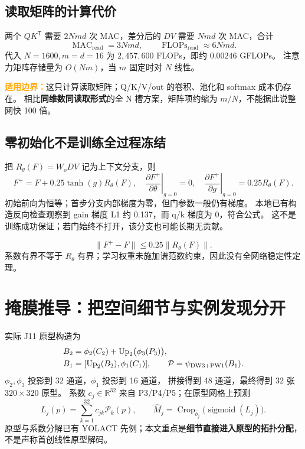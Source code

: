 \documentclass[UTF8,a4paper,11pt,fontset=windows]{ctexart}
\newcommand{\R}{\mathbb{R}}
\newcommand{\sigmoid}{\operatorname{sigmoid}}
\newcommand{\Up}{\operatorname{Up}}
\newcommand{\tr}{\mathsf{T}}
\newcommand{\limitation}[1]{\par\noindent\textcolor{orange}{\textbf{适用边界：}}#1\par}
\begin{document}
\subsection{读取矩阵的计算代价}
两个 \(QK^\tr\) 需要 \(2Nmd\) 次 MAC，差分后的 \(DV\) 需要 \(Nmd\) 次 MAC，合计
\begin{equation}
\operatorname{MAC}_{\mathrm{read}}=3Nmd,
\qquad \operatorname{FLOPs}_{\mathrm{read}}\approx6Nmd.
\label{eq:attncost}
\end{equation}
代入 \(N=1600,m=d=16\) 为 \(2{,}457{,}600\) FLOPs，即约 \(0.00246\) GFLOPs。
注意力矩阵存储量为 \(O(Nm)\)，当 \(m\) 固定时对 \(N\) 线性。
\limitation{这只计算读取矩阵；Q/K/V/out 的卷积、池化和 softmax 成本仍存在。
相比\textbf{同维数同读取形式}的全 N 槽方案，矩阵项约缩为 \(m/N\)，不能据此说整网快 100 倍。}

\subsection{零初始化不是训练全过程冻结}
把 \(R_\theta(F)=W_oDV\) 记为上下文分支，则
\begin{equation}
F^+=F+0.25\tanh(g)R_\theta(F),\quad
\left.\frac{\partial F^+}{\partial\theta}\right|_{g=0}=0,\quad
\left.\frac{\partial F^+}{\partial g}\right|_{g=0}=0.25R_\theta(F).
\label{eq:zerogate}
\end{equation}
初始前向为恒等；首步分支内部梯度为零，但门参数一般仍有梯度。
本地已有构造反向检查观察到 gain 梯度 L1 约 0.137，而 q/k 梯度为 0，符合公式。
这不是训练成功保证；若门始终不打开，该分支也可能长期无贡献。

\begin{equation}
\|F^+-F\|\leq0.25\|R_\theta(F)\|.
\end{equation}
系数有界不等于 \(R_\theta\) 有界；学习权重未施加谱范数约束，因此没有全网络稳定性定理。
\clearpage

\section{掩膜推导：把空间细节与实例发现分开}
\label{sec:mask}
实际 J11 原型构造为
\begin{align}
B_2&=\phi_2(C_2)+\Up_{2}\bigl(\phi_3(P_3)\bigr),\notag\\
B_1&=[\Up_{2}(B_2),\phi_1(C_1)],\qquad
\mathcal P=\psi_{\mathrm{DW3+PW1}}(B_1).
\label{eq:proto}
\end{align}
\(\phi_2,\phi_3\) 投影到 32 通道，\(\phi_1\) 投影到 16 通道，
拼接得到 48 通道，最终得到 32 张 \(320\times320\) 原型。
系数 \(c_j\in\R^{32}\) 来自 P3/P4/P5；在原型网格上预测
\begin{equation}
L_j(p)=\sum_{k=1}^{32}c_{jk}\mathcal P_k(p),\qquad
\hat M_j=\operatorname{Crop}_{\hat b_j}\bigl(\sigmoid(L_j)\bigr).
\label{eq:mask}
\end{equation}
原型与系数分解已有 YOLACT 先例\cite{yolact}；本文重点是\textbf{细节直接进入原型的拓扑分配}，
不是声称首创线性原型解码。
\end{document}
